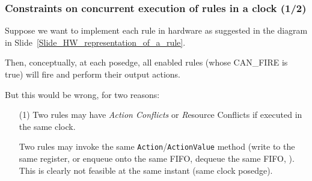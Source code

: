 \begin{frame}[fragile]
\frametitle{Constraints on concurrent execution of rules in a clock (1/2)}

\footnotesize

Suppose we want to implement each rule in hardware as suggested in the
diagram in Slide~\ref{Slide_HW_representation_of_a_rule}.

\vspace{2ex}

Then, conceptually, at each posedge, all enabled rules (whose
CAN\_FIRE is true) will fire and perform their output actions.

\vspace{2ex}

But this would be wrong, for two reasons:

\begin{itemize}

 \item[(1)] Two rules may have \emph{Action Conflicts} or {\emph
       Resource Conflicts} if executed in the same clock.

       \vspace{2ex}

       Two rules may invoke the same {\tt Action}/{\tt ActionValue}
       method (write to the same register, or enqueue onto the same
       FIFO, dequeue the same FIFO, {\etc}).  This is clearly not
       feasible at the same instant (same clock posedge).

\end{itemize}

\end{frame}


